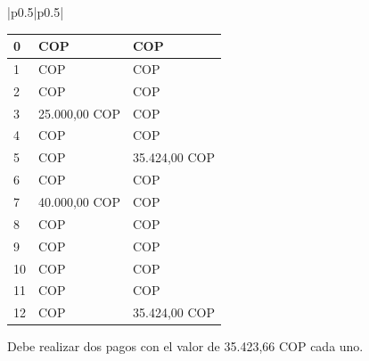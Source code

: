\begin{center}
\begin{longtable}[H]{|p{0.5\linewidth}|p{0.5\linewidth}|}
{\begin{center}
\begin{tabular}{|p{4cm}|p{4cm}|p{4cm}|}
    0                &  COP                      &  COP                          \\ \hline
    1                &  COP                      &  COP                          \\ \hline
    2                &  COP                      &  COP                          \\ \hline
    3                &  25.000,00 COP             &  COP                          \\ \hline
    4                &  COP                       &  COP                          \\ \hline
    5                &  COP                      &  35.424,00 COP                 \\ \hline
    6                &  COP                      &  COP                          \\ \hline
    7                &  40.000,00 COP            &  COP                          \\ \hline
    8                &  COP                      &  COP                          \\ \hline
    9                &  COP                      &  COP                          \\ \hline
    10               &  COP                      &  COP                          \\ \hline
    11               &  COP                      &  COP                          \\ \hline
    12               &  COP                      &  35.424,00 COP                 \\ \hline
   \end{tabular}
  \end{center}

  Debe realizar dos pagos con el valor de 35.423,66 COP cada uno.
  }                                                                                                           \\ \hline
                                             \\ \hline
                      \\ \hline
 \end{longtable}
\end{center}

